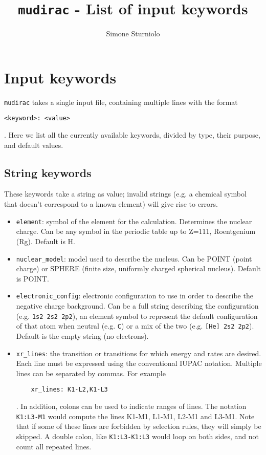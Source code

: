 \documentclass[]{article}
\title{\texttt{mudirac} - List of input keywords}
\author{Simone Sturniolo}
\begin{document}
\maketitle

\section{Input keywords}\label{APP:keyw}

\texttt{mudirac} takes a single input file, containing multiple lines with the format

\begin{verbatim}
<keyword>: <value>
\end{verbatim}

. Here we list all the currently available keywords, divided by type, their purpose, and default values.

\subsection{String keywords}

These keywords take a string as value; invalid strings (e.g. a chemical symbol that doesn't correspond to a known element) will give rise to errors.

\begin{itemize}
	\item \texttt{element}: symbol of the element for the calculation. Determines the nuclear charge. Can be any symbol in the periodic table up to Z=111, Roentgenium (Rg). Default is H.
	\item \texttt{nuclear\_model}: model used to describe the nucleus. Can be POINT (point charge) or SPHERE (finite size, uniformly charged spherical nucleus). Default is POINT.
	\item \texttt{electronic\_config}: electronic configuration to use in order to describe the negative charge background. Can be a full string describing the configuration (e.g. \texttt{1s2 2s2 2p2}), an element symbol to represent the default configuration of that atom when neutral (e.g. \texttt{C}) or a mix of the two (e.g. \texttt{[He] 2s2 2p2}). Default is the empty string (no electrons).
	\item \texttt{xr\_lines}: the transition or transitions for which energy and rates are desired. Each line must be expressed using the conventional IUPAC notation. Multiple lines can be separated by commas. For example
	
	\begin{verbatim}
	xr_lines: K1-L2,K1-L3
	\end{verbatim}
	
	. In addition, colons can be used to indicate ranges of lines. The notation \texttt{K1:L3-M1} would compute the lines K1-M1, L1-M1, L2-M1 and L3-M1. Note that if some of these lines are forbidden by selection rules, they will simply be skipped. A double colon, like \texttt{K1:L3-K1:L3} would loop on both sides, and not count all repeated lines. 
\end{itemize}
\end{document}
